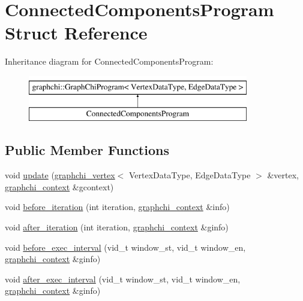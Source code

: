 \hypertarget{struct_connected_components_program}{\section{Connected\-Components\-Program Struct Reference}
\label{struct_connected_components_program}
}
Inheritance diagram for Connected\-Components\-Program\-:\begin{figure}[H]
\begin{center}
\leavevmode
\includegraphics[height=2.000000cm]{struct_connected_components_program}
\end{center}
\end{figure}
\subsection*{Public Member Functions}
\begin{DoxyCompactItemize}
\item 
void \hyperlink{struct_connected_components_program_a31f583b07a3882bb1c231070d2f430c2}{update} (\hyperlink{classgraphchi_1_1graphchi__vertex}{graphchi\-\_\-vertex}$<$ Vertex\-Data\-Type, Edge\-Data\-Type $>$ \&vertex, \hyperlink{structgraphchi_1_1graphchi__context}{graphchi\-\_\-context} \&gcontext)
\item 
void \hyperlink{struct_connected_components_program_aae6274665671c137878968c6714cfdcf}{before\-\_\-iteration} (int iteration, \hyperlink{structgraphchi_1_1graphchi__context}{graphchi\-\_\-context} \&info)
\item 
void \hyperlink{struct_connected_components_program_acfee1eaafacf9a197b17fefb365914ba}{after\-\_\-iteration} (int iteration, \hyperlink{structgraphchi_1_1graphchi__context}{graphchi\-\_\-context} \&ginfo)
\item 
void \hyperlink{struct_connected_components_program_ab8720ed99bd8d2bc555e8e545a48a858}{before\-\_\-exec\-\_\-interval} (vid\-\_\-t window\-\_\-st, vid\-\_\-t window\-\_\-en, \hyperlink{structgraphchi_1_1graphchi__context}{graphchi\-\_\-context} \&ginfo)
\item 
void \hyperlink{struct_connected_components_program_ac7970431691b01689a29cee5f0baa759}{after\-\_\-exec\-\_\-interval} (vid\-\_\-t window\-\_\-st, vid\-\_\-t window\-\_\-en, \hyperlink{structgraphchi_1_1graphchi__context}{graphchi\-\_\-context} \&ginfo)
\end{DoxyCompactItemize}
